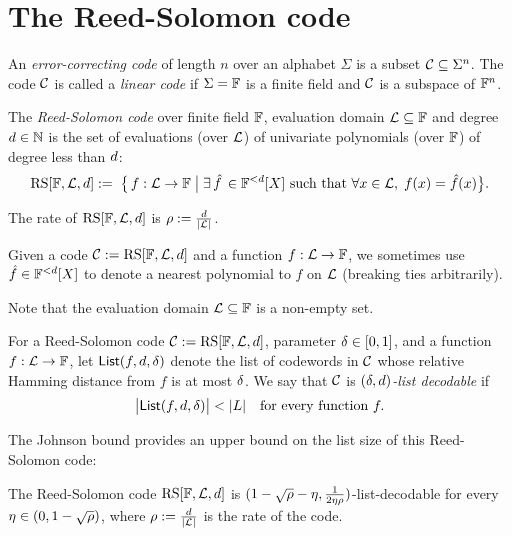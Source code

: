 \chapter{The Reed-Solomon code}

\begin{definition}\label{def:eccode}
    An \emph{error-correcting code} of length \(n\) over an alphabet \(\Sigma\) is a subset \(\mathcal{C} \subseteq \Sigma^n\). The code \(\mathcal{C}\) is called a \emph{linear code} if
    \(\Sigma = \mathbb{F}\) is a finite field and \(\mathcal{C}\) is a subspace of \({\mathbb{F}}^n\).
\end{definition}

\begin{definition}\label{def:rscode}
\leanok
    The \emph{Reed-Solomon code} over finite field $\mathbb{F}$, evaluation domain $\mathcal{L}\subseteq\mathbb{F}$ and degree $d\in\mathbb{N}$ is the set of evaluations (over $\mathcal{L}$) of univariate polynomials (over $\mathbb{F}$) of degree less than $d$:
    \[
        \mathrm{RS}[\mathbb{F},\mathcal{L},d]:=\; \bigl\{\, f : \mathcal{L} \to \mathbb{F} \;\big|\; \exists \,\hat{f} \,\in \mathbb{F}^{<d}[X]\text{ such that } \forall x \in \mathcal{L},\; f(x) = \hat{f}(x)\bigr\}.
    \]

    The rate of $\mathrm{RS}[\mathbb{F},\mathcal{L},d]$ is $\rho := \frac{d}{\lvert \mathcal{L} \rvert}$.

    Given a code $\mathcal{C} := \mathrm{RS}[\mathbb{F},\mathcal{L},d]$ and a function $f : \mathcal{L} \to \mathbb{F}$, we sometimes use $\hat{f} \in \mathbb{F}^{<d}[X]$ to denote a nearest polynomial to $f$ on $\mathcal{L}$ (breaking ties arbitrarily).
\end{definition}

\begin{remark}
Note that the evaluation domain $\mathcal{L}\subseteq\mathbb{F}$ is a non-empty set.
\end{remark}

\begin{definition}\label{def:list_decodable}
{}
    For a Reed-Solomon code $\mathcal{C} := \mathrm{RS}[\mathbb{F},\mathcal{L},d]$, parameter $\delta \in [0,1]$, 
    and a function $f:\mathcal{L}\to\mathbb{F}$, let $\mathsf{List}(f,d,\delta)$ denote the list 
    of codewords in $\mathcal{C}$ whose relative Hamming distance from $f$ is at most $\delta$.
    We say that $\mathcal{C}$ is \emph{$(\delta,d)$-list decodable} if 
    \[
    \bigl|\mathsf{List}(f,d,\delta)\bigr| < |L|
    \quad
    \text{for every function } f.
    \]
\end{definition}
    
    \noindent
    The Johnson bound provides an upper bound on the list size of this Reed-Solomon code:
    
    \begin{theorem}\label{thm:johnson_bnd}
    The Reed-Solomon code $\mathrm{RS}[\mathbb{F},\mathcal{L},d]$ is $(1-\sqrt{\rho}-\eta,\frac{1}{2\eta\rho})$-list-decodable for every $\eta\in(0,1-\sqrt{\rho})$, where $\rho:=\frac{d}{|\mathcal{L}|}$ is the rate of the code.
    \end{theorem}
    